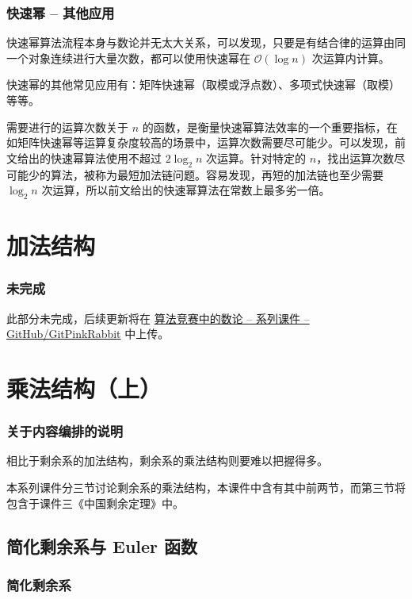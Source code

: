 \documentclass{../pkslide}
\begin{document}
\begin{frame}
  \frametitle{快速幂 -- 其他应用}
  快速幂算法流程本身与数论并无太大关系，可以发现，只要是有结合律的运算由同一个对象连续进行大量次数，都可以使用快速幂在 $\mathcal O (\log n)$ 次运算内计算。
  
  快速幂的其他常见应用有：矩阵快速幂（取模或浮点数）、多项式快速幂（取模）等等。
  
  \pause
  \emptyline
  需要进行的运算次数关于 $n$ 的函数，是衡量快速幂算法效率的一个重要指标，在如矩阵快速幂等运算复杂度较高的场景中，运算次数需要尽可能少。可以发现，前文给出的快速幂算法使用不超过 $2 \log_2 n$ 次运算。针对特定的 $n$，找出运算次数尽可能少的算法，被称为最短加法链问题。容易发现，再短的加法链也至少需要 $\log_2 n$ 次运算，所以前文给出的快速幂算法在常数上最多劣一倍。
\end{frame}

\section{加法结构}

\begin{frame}
  \frametitle{未完成}
  此部分未完成，后续更新将在 \href{https://github.com/GitPinkRabbit/Number-Theory-in-Competitive-Programming}{算法竞赛中的数论 -- 系列课件 -- GitHub/GitPinkRabbit} 中上传。
\end{frame}

\section{乘法结构（上）}

\begin{frame}
  \frametitle{关于内容编排的说明}
  相比于剩余系的加法结构，剩余系的乘法结构则要难以把握得多。
  
  本系列课件分三节讨论剩余系的乘法结构，本课件中含有其中前两节，而第三节将包含于课件三《中国剩余定理》中。
\end{frame}

\subsection{简化剩余系与 Euler 函数}
\subsubsection{简化剩余系}
\end{document}
